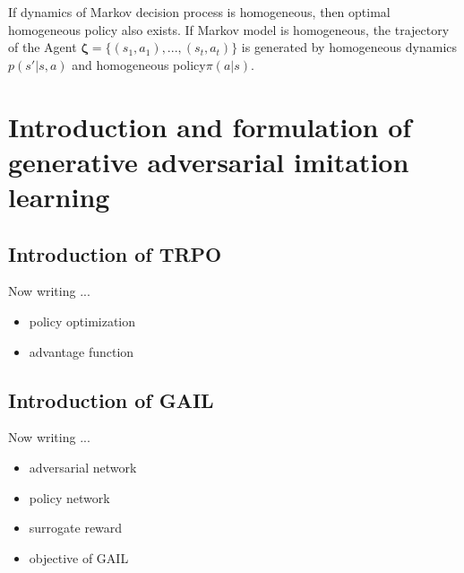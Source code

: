 If dynamics of Markov decision process is homogeneous, then optimal homogeneous policy also exists.
If Markov model is homogeneous, the trajectory of the Agent $\bm{\zeta} = \{ (s_1, a_1), ... , (s_t, a_t) \}$ is generated by homogeneous dynamics $p(s'|s,a)$ and homogeneous policy$\pi(a|s)$.  


\section{Introduction and formulation of generative adversarial imitation learning}

\subsection{Introduction of TRPO}

Now writing ...

\begin{itemize}
\item policy optimization
\item advantage function
\end{itemize}


\subsection{Introduction of GAIL}

Now writing ...

\begin{itemize}
\item adversarial network
\item policy network
\item surrogate reward
\item objective of GAIL
\end{itemize}


